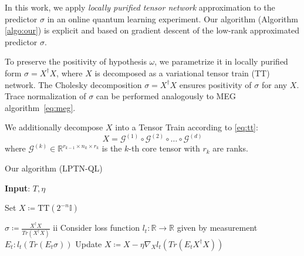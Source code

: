 \documentclass[%
 reprint,
 amsmath,amssymb,
 aps,
]{revtex4-2}
\begin{document}
In this work, we apply {\itshape locally purified tensor network} approximation to the predictor $\sigma$ in an online quantum learning experiment. Our algorithm (Algorithm \ref{algo:our}) is explicit and based on gradient descent of the low-rank approximated predictor $\sigma$.

To preserve the positivity of hypothesis $\omega$, we parametrize it in locally purified form $\sigma = X^\dagger X$, where $X$ is decomposed as a variational tensor train (TT) network. The Cholesky decomposition $\sigma = X^\dagger X$ ensures positivity of $\sigma$ for any $X$. Trace normalization of $\sigma$ can be performed analogously to MEG algorithm~\eqref{eq:meg}.

We additionally decompose $X$ into a Tensor Train according to \eqref{eq:tt}:
\begin{equation}
    X=\mathcal{G}^{(1)}\circ\mathcal{G}^{(2)}\circ\dots\circ\mathcal{G}^{(d)}
\end{equation}
where $\mathcal{G}^{(k)}\in\mathbb{R}^{r_{k-1}\times n_k\times r_k}$ is the $k$-th core tensor with $r_k$ are ranks.


\begin{algorithm}
\caption{Our algorithm (LPTN-QL)\\}
\label{algo:our}
\hspace*{\algorithmicindent} \textbf{Input}: $T,\eta$ \\
\begin{algorithmic}[1]
\State Set $X\coloneqq \text{TT}(2^{-n}\mathbb{I})$

    \State $\sigma \coloneqq \frac{X^\dagger X}{Tr(X^\dagger X)}$
ii    \State Consider loss function $l_t : \mathbb{R} \rightarrow \mathbb{R}$ given by measurement $E_t : l_t(Tr(E_t\sigma))$
    \State Update $X\coloneqq X-\eta\nabla_X l_t(Tr(E_t X^\dagger X))$
\EndFor

\end{algorithmic}
\end{algorithm}
\end{document}
